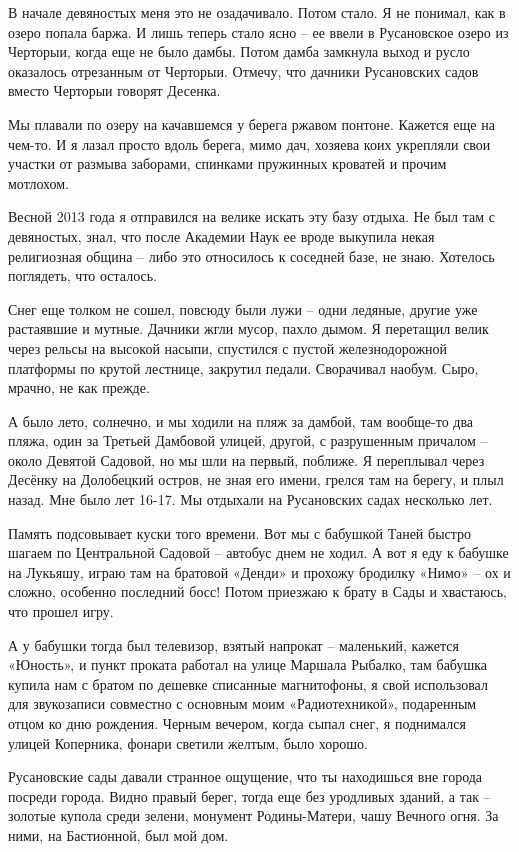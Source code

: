 В начале девяностых меня это не озадачивало. Потом стало. Я не понимал, как в озеро попала баржа. И лишь теперь стало ясно – ее ввели в Русановское озеро из Черторыи, когда еще не было дамбы. Потом дамба замкнула выход и русло оказалось отрезанным от Черторыи. Отмечу, что дачники Русановских садов вместо Черторыи говорят Десенка.

Мы плавали по озеру на качавшемся у берега ржавом понтоне. Кажется еще на чем-то. И я лазал просто вдоль берега, мимо дач, хозяева коих укрепляли свои участки от размыва заборами, спинками пружинных кроватей и прочим мотлохом.

Весной 2013 года я отправился на велике искать эту базу отдыха. Не был там с девяностых, знал, что после Академии Наук ее вроде выкупила некая религиозная община – либо это относилось к соседней базе, не знаю. Хотелось поглядеть, что осталось.

Снег еще толком не сошел, повсюду были лужи – одни ледяные, другие уже растаявшие и мутные. Дачники жгли мусор, пахло дымом. Я перетащил велик через рельсы на высокой насыпи, спустился с пустой железнодорожной платформы по крутой лестнице, закрутил педали. Сворачивал наобум. Сыро, мрачно, не как прежде.

А было лето, солнечно, и мы ходили на пляж за дамбой, там вообще-то два пляжа, один за Третьей Дамбовой улицей, другой, с разрушенным причалом – около Девятой Садовой, но мы шли на первый, поближе. Я переплывал через Десёнку на Долобецкий остров, не зная его имени, грелся там на берегу, и плыл назад. Мне было лет 16-17. Мы отдыхали на Русановских садах несколько лет.

Память подсовывает куски того времени. Вот мы с бабушкой Таней быстро шагаем по Центральной Садовой – автобус днем не ходил. А вот я еду к бабушке на Лукьяшу, играю там на братовой «Денди» и прохожу бродилку «Нимо» – ох и сложно, особенно последний босс! Потом приезжаю к брату в Сады и хвастаюсь, что прошел игру.

А у бабушки тогда был телевизор, взятый напрокат – маленький, кажется «Юность», и пункт проката работал на улице Маршала Рыбалко, там бабушка купила нам с братом по дешевке списанные магнитофоны, я свой использовал для звукозаписи совместно с основным моим «Радиотехникой», подаренным отцом ко дню рождения. Черным вечером, когда сыпал снег, я поднимался улицей Коперника, фонари светили желтым, было хорошо.

Русановские сады давали странное ощущение, что ты находишься вне города посреди города. Видно правый берег, тогда еще без уродливых зданий, а так – золотые купола среди зелени, монумент Родины-Матери, чашу Вечного огня. За ними, на Бастионной, был мой дом.

